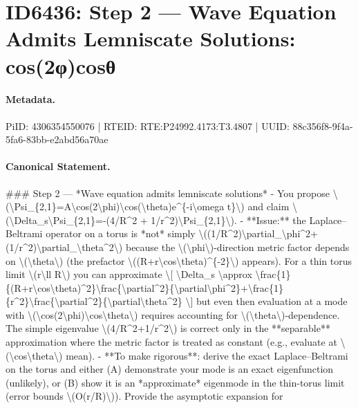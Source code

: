 \section*{ID6436: Step 2 — Wave Equation Admits Lemniscate Solutions: cos(2φ)cosθ}
\paragraph{Metadata.}
PiID: 4306354550076 | RTEID: RTE:P24992.4173:T3.4807 | UUID: 88c356f8-9f4a-5fa6-83bb-e2abd56a70ae

\paragraph{Canonical Statement.}
\#\#\# Step 2 — *Wave equation admits lemniscate solutions* - You propose \textbackslash{}(\textbackslash{}Psi\_\{2,1\}=A\textbackslash{}cos(2\textbackslash{}phi)\textbackslash{}cos(\textbackslash{}theta)e\textasciicircum{}\{-i\textbackslash{}omega t\}\textbackslash{}) and claim \textbackslash{}(\textbackslash{}Delta\_s\textbackslash{}Psi\_\{2,1\}=-(4/R\textasciicircum{}2 + 1/r\textasciicircum{}2)\textbackslash{}Psi\_\{2,1\}\textbackslash{}). - **Issue:** the Laplace–Beltrami operator on a torus is *not* simply \textbackslash{}((1/R\textasciicircum{}2)\textbackslash{}partial\_\textbackslash{}phi\textasciicircum{}2+(1/r\textasciicircum{}2)\textbackslash{}partial\_\textbackslash{}theta\textasciicircum{}2\textbackslash{}) because the \textbackslash{}(\textbackslash{}phi\textbackslash{})-direction metric factor depends on \textbackslash{}(\textbackslash{}theta\textbackslash{}) (the prefactor \textbackslash{}((R+r\textbackslash{}cos\textbackslash{}theta)\textasciicircum{}\{-2\}\textbackslash{}) appears). For a thin torus limit \textbackslash{}(r\textbackslash{}ll R\textbackslash{}) you can approximate \textbackslash{}[ \textbackslash{}Delta\_s \textbackslash{}approx \textbackslash{}frac\{1\}\{(R+r\textbackslash{}cos\textbackslash{}theta)\textasciicircum{}2\}\textbackslash{}frac\{\textbackslash{}partial\textasciicircum{}2\}\{\textbackslash{}partial\textbackslash{}phi\textasciicircum{}2\}+\textbackslash{}frac\{1\}\{r\textasciicircum{}2\}\textbackslash{}frac\{\textbackslash{}partial\textasciicircum{}2\}\{\textbackslash{}partial\textbackslash{}theta\textasciicircum{}2\} \textbackslash{}] but even then evaluation at a mode with \textbackslash{}(\textbackslash{}cos(2\textbackslash{}phi)\textbackslash{}cos\textbackslash{}theta\textbackslash{}) requires accounting for \textbackslash{}(\textbackslash{}theta\textbackslash{})-dependence. The simple eigenvalue \textbackslash{}(4/R\textasciicircum{}2+1/r\textasciicircum{}2\textbackslash{}) is correct only in the **separable** approximation where the metric factor is treated as constant (e.g., evaluate at \textbackslash{}(\textbackslash{}cos\textbackslash{}theta\textbackslash{}) mean). - **To make rigorous**: derive the exact Laplace–Beltrami on the torus and either (A) demonstrate your mode is an exact eigenfunction (unlikely), or (B) show it is an *approximate* eigenmode in the thin-torus limit (error bounds \textbackslash{}(O(r/R)\textbackslash{})). Provide the asymptotic expansion for 